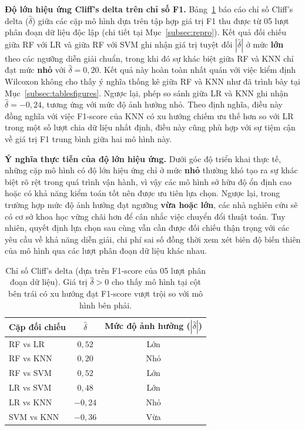 \documentclass[14pt,a4paper]{extreport}
\begin{document}
\textbf{Độ lớn hiệu ứng Cliff's delta trên chỉ số F1.} Bảng~\ref{tab:cliffs-delta} báo cáo chỉ số Cliff's delta ($\hat{\delta}$) giữa các cặp mô hình dựa trên tập hợp giá trị F1 thu được từ 05 lượt phân đoạn dữ liệu độc lập (chi tiết tại Mục~\ref{subsec:repro}). Kết quả đối chiếu giữa RF với LR và giữa RF với SVM ghi nhận giá trị tuyệt đối $|\hat{\delta}|$ ở mức \textbf{lớn} theo các ngưỡng diễn giải chuẩn, trong khi đó sự khác biệt giữa RF và KNN chỉ đạt mức \textbf{nhỏ} với $\hat{\delta}=0,20$. Kết quả này hoàn toàn nhất quán với việc kiểm định Wilcoxon không cho thấy ý nghĩa thống kê giữa RF và KNN như đã trình bày tại Mục~\ref{subsec:tablesfigures}. Ngược lại, phép so sánh giữa LR và KNN ghi nhận $\hat{\delta}=-0,24$, tương ứng với mức độ ảnh hưởng nhỏ. Theo định nghĩa, điều này đồng nghĩa với việc F1-score của KNN có xu hướng chiếm ưu thế hơn so với LR trong một số lượt chia dữ liệu nhất định, điều này cũng phù hợp với sự tiệm cận về giá trị F1 trung bình giữa hai mô hình này.

\textbf{Ý nghĩa thực tiễn của độ lớn hiệu ứng.} Dưới góc độ triển khai thực tế, những cặp mô hình có độ lớn hiệu ứng chỉ ở mức \textbf{nhỏ} thường khó tạo ra sự khác biệt rõ rệt trong quá trình vận hành, vì vậy các mô hình sở hữu độ ổn định cao hoặc có khả năng kiểm toán tốt nên được ưu tiên lựa chọn. Ngược lại, trong trường hợp mức độ ảnh hưởng đạt ngưỡng \textbf{vừa hoặc lớn}, các nhà nghiên cứu sẽ có cơ sở khoa học vững chãi hơn để cân nhắc việc chuyển đổi thuật toán. Tuy nhiên, quyết định lựa chọn sau cùng vẫn cần được đối chiếu thận trọng với các yêu cầu về khả năng diễn giải, chi phí sai số đồng thời xem xét biên độ biến thiên của mô hình qua các lượt phân đoạn dữ liệu khác nhau.

\begin{table}[htbp]
  \centering
  \small
  \caption{Chỉ số Cliff's delta (dựa trên F1-score của 05 lượt phân đoạn dữ liệu). Giá trị $\hat{\delta} > 0$ cho thấy mô hình tại cột bên trái có xu hướng đạt F1-score vượt trội so với mô hình bên phải.}
  \label{tab:cliffs-delta}
  \begin{tabular}{lcc}
    \toprule
    Cặp đối chiếu & $\hat{\delta}$ & Mức độ ảnh hưởng ($|\hat{\delta}|$) \\
    \midrule
    RF vs LR   & $0,52$ & Lớn \\
    RF vs KNN  & $0,20$ & Nhỏ \\
    RF vs SVM  & $0,52$ & Lớn \\
    LR vs SVM  & $0,48$ & Lớn \\
    LR vs KNN  & $-0,24$ & Nhỏ \\
    SVM vs KNN & $-0,36$ & Vừa \\
    \bottomrule
  \end{tabular}
\end{table}
\end{document}
